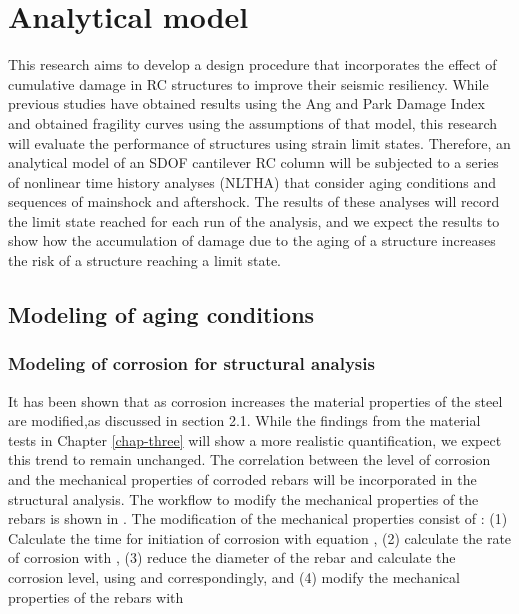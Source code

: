 \chapter{Analytical model}
\label{chap-five}
This research aims to develop a design procedure that incorporates the effect of cumulative damage in RC structures to improve their seismic resiliency. While previous studies have obtained results using the Ang and Park Damage Index and obtained fragility curves using the assumptions of that model, this research will evaluate the performance of structures using strain limit states. Therefore, an analytical model of an SDOF cantilever RC column will be subjected to a series of nonlinear time history analyses (NLTHA) that consider aging conditions and sequences of mainshock and aftershock. The results of these analyses will record the limit state reached for each run of the analysis, and we expect the results to show how the accumulation of damage due to the aging of a structure increases the risk of a structure reaching a limit state. 

\section{Modeling of aging conditions}

\subsection{Modeling of corrosion for structural analysis}

It has been shown that as corrosion increases the material properties of the steel are modified,as discussed in section 2.1. While the findings from the material tests in Chapter \ref{chap-three} will show a more realistic quantification, we expect this trend to remain unchanged. The correlation between the level of corrosion and the mechanical properties of corroded rebars will be incorporated in the structural analysis. The workflow to modify the mechanical properties of the rebars is shown in . The modification of the mechanical properties consist of : (1) Calculate  the time for initiation of corrosion with equation , (2) calculate the rate of corrosion with , (3) reduce the diameter of the rebar and calculate the corrosion level, using  and  correspondingly, and (4) modify the mechanical properties of the rebars with 

